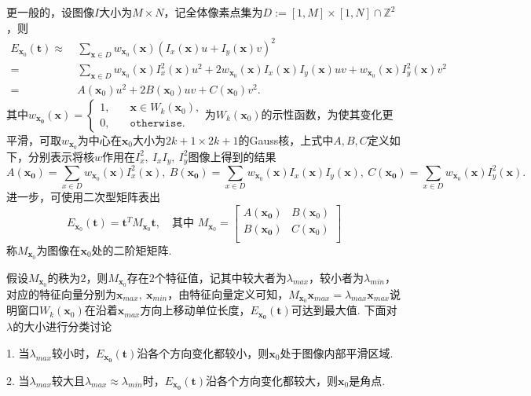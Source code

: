 \documentclass[12pt, a4paper, oneside]{ctexart}
\numberwithin{equation}{section}  %
\def\bd{\boldsymbol}        %
\def\Z{\mathbb{Z}}          %
\def\add{\vspace{1ex}}      %
\begin{document}
更一般的，设图像$I$大小为$M\times N$，记全体像素点集为$D:=[1,M]\times [1,N]\cap \Z^2$，则
\begin{align*}
    E_{\bd{x}_0}(\bd{t})\approx&\ \sum_{\bd{x}\in D}w_{\bd{x}_0}(\bd{x})\left(I_x(\bd{x})u+I_y(\bd{x})v\right)^2\\
    =&\ \sum_{\bd{x}\in D}w_{\bd{x}_0}(\bd{x})I_x^2(\bd{x})u^2+ 2w_{\bd{x}_0}(\bd{x})I_x(\bd{x})I_y(\bd{x})uv+w_{\bd{x}_0}(\bd{x})I_y^2(\bd{x})v^2\\
    =&\ A(\bd{x}_0)u^2+2B(\bd{x}_0)uv+C(\bd{x}_0)v^2.
\end{align*}
其中$w_{\bd{x_0}}(\bd{x}) = \begin{cases}
    1,&\quad \bd{x}\in W_k(\bd{x}_0),\\
    0,&\quad \texttt{otherwise}.
\end{cases}$为$W_k(\bd{x}_0)$的示性函数，\add 为使其变化更平滑，可取$w_{\bd{x}_0}$为中心在$\bd{x}_0$大小为$2k+1\times 2k+1$的Gauss核，上式中$A,B,C$定义如下，分别表示将核$w$作用在$I_x^2,\ I_xI_y,\ I_y^2$图像上得到的结果
\begin{equation*}
A(\bd{x_0}) = \sum_{x\in D}w_{\bd{x}_0}(\bd{x})I_x^2(\bd{x}),\ B(\bd{x_0}) = \sum_{x\in D}w_{\bd{x}_0}(\bd{x})I_x(\bd{x})I_y(\bd{x}),\ C(\bd{x_0}) = \sum_{x\in D}w_{\bd{x}_0}(\bd{x})I_y^2(\bd{x}).
\end{equation*}
进一步，可使用二次型矩阵表出
\begin{equation*}
    E_{\bd{x}_0}(\bd{t}) = \bd{t}^TM_{\bd{x}_0}\bd{t},\quad \text{其中 }M_{\bd{x}_0}=\left[\begin{matrix}
        A(\bd{x_0})&B(\bd{x}_0)\\
        B(\bd{x_0})&C(\bd{x}_0)\\
    \end{matrix}\right]
\end{equation*}
称$M_{\bd{x}_0}$为图像在$\bd{x}_0$处的二阶矩矩阵.

假设$M_{\bd{x}_0}$的秩为$2$，则$M_{\bd{x}_0}$存在$2$个特征值，记其中较大者为$\lambda_{max}$，较小者为$\lambda_{min}$，对应的特征向量分别为$\bd{x}_{max},\ \bd{x}_{min}$，由特征向量定义可知，$M_{\bd{x}_0}\bd{x}_{max} = \lambda_{max}\bd{x}_{max}$说明窗口$W_k(\bd{x}_0)$在沿着$\bd{x}_{max}$方向上移动单位长度，$E_{\bd{x_0}}(\bd{t})$可达到最大值. 下面对$\lambda$的大小进行分类讨论

1. 当$\lambda_{max}$较小时，$E_{\bd{x_0}}(\bd{t})$沿各个方向变化都较小，则$\bd{x}_0$处于图像内部平滑区域.

2. 当$\lambda_{max}$较大且$\lambda_{max}\approx\lambda_{min}$时，$E_{\bd{x_0}}(\bd{t})$沿各个方向变化都较大，则$\bd{x}_0$是角点.
\end{document}
